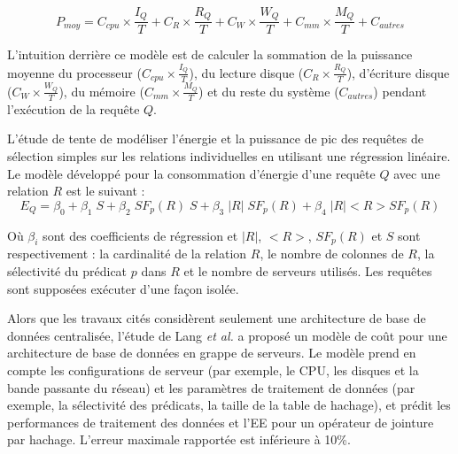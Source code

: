 \begin{equation}\label{eq:lang11}
 P_{moy} = C_{cpu} \times \frac{I_Q}{T} + C_R \times \frac{R_Q}{T} + C_W \times \frac{W_Q}{T} + C_{mm} \times \frac{M_Q}{T} + C_{autres}
\end{equation}

L'intuition derrière ce modèle est de calculer la sommation de la puissance moyenne du processeur ($C_{cpu} \times \frac{I_Q}{T}$), du lecture disque ($C_R \times \frac{R_Q}{T}$), d'écriture disque ($C_W \times \frac{W_Q}{T}$), du mémoire ($C_{mm} \times \frac{M_Q}{T}$) et du reste du système ($C_{autres}$) pendant l'exécution de la requête $Q$.

L'étude de \cite{Rodriguez11} tente de modéliser l'énergie et la puissance de pic des requêtes de sélection simples sur les relations individuelles en utilisant une régression linéaire. Le modèle développé pour la consommation d'énergie d'une requête $Q$ avec une relation $R$ est le suivant :
\begin{equation}
 E_Q = \beta_0 + \beta_1 \; S + \beta_2 \; SF_p(R) \; S + \beta_3 \; |R| \; SF_p(R) + \beta_4 \; |R| <R> SF_p(R)
\end{equation}

Où $\beta_i$ sont des coefficients de régression et $|R|$, $<R>$, $SF_p(R)$ et $S$ sont respectivement : la cardinalité de la relation $R$, le nombre de colonnes de $R$, la sélectivité du prédicat $p$ dans $R$ et le nombre de serveurs utilisés. Les requêtes sont supposées exécuter d'une façon isolée.

Alors que les travaux cités considèrent seulement une architecture de base de données centralisée, l'étude de Lang \textit{et al.} \cite{Lang12} a proposé un modèle de coût pour une architecture de base de données en grappe de serveurs. Le modèle prend en compte les configurations de serveur (par exemple, le CPU, les disques et la bande passante du réseau) et les paramètres de traitement de données (par exemple, la sélectivité des prédicats, la taille de la table de hachage), et prédit les performances de traitement des données et l'EE pour un opérateur de jointure par hachage. L'erreur maximale rapportée est inférieure à 10\%.

